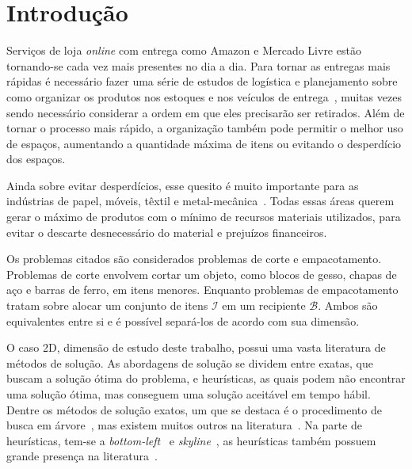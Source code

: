 \section{Introdução}\label{sec:introducao}

Serviços de loja \textit{online} com entrega como Amazon e Mercado Livre estão tornando-se cada vez
mais presentes no dia a dia.
Para tornar as entregas mais rápidas é necessário fazer uma série de estudos de logística e
planejamento sobre como organizar os produtos nos estoques e nos veículos de entrega~\cite{
    silva2022integer,morabito1992abordagem}, muitas vezes sendo necessário considerar a ordem
em que eles precisarão ser retirados.
Além de tornar o processo mais rápido, a organização também pode permitir o melhor uso de espaços,
aumentando a quantidade máxima de itens ou evitando o desperdício dos espaços.

Ainda sobre evitar desperdícios, esse quesito é muito importante para as indústrias de papel,
móveis, têxtil e metal-mecânica~\cite{queiroz2022estudo,cavali2004problemas,belluzzo2005otimizacao}.
Todas essas áreas querem gerar o máximo de produtos com o mínimo de recursos materiais utilizados,
para evitar o descarte desnecessário do material e prejuízos financeiros.

Os problemas citados são considerados problemas de corte e empacotamento.
Problemas de corte envolvem cortar um objeto, como blocos de gesso, chapas de aço e barras de ferro,
em itens menores.
Enquanto problemas de empacotamento tratam sobre alocar um conjunto de itens $\mathcal{I}$ em um
recipiente $\mathcal{B}$.
Ambos são equivalentes entre si e é possível separá-los de acordo com sua dimensão.

O caso 2D, dimensão de estudo deste trabalho, possui uma vasta literatura de métodos de solução.
As abordagens de solução se dividem entre exatas, que buscam a solução ótima do problema, e
heurísticas, as quais podem não encontrar uma solução ótima, mas conseguem uma solução aceitável em
tempo hábil.
Dentre os métodos de solução exatos, um que se destaca é o procedimento de busca em árvore~\cite{
    beasley1985exact}, mas existem muitos outros na literatura~\cite{exact-solution-techniques,
    fekete1997new,delorme2016bin,kenmochi2009exact}.
Na parte de heurísticas, tem-se a \textit{bottom-left}~\cite{baker1980orthogonal,chehrazad2022fast}
e \textit{skyline}~\cite{wei2011skyline}, as heurísticas também possuem grande presença na
literatura~\cite{burke2004new,rakotonirainy2020improved,hopper2001empirical,chen2019efficient,
    huang2007efficient,hopper2001review}.

